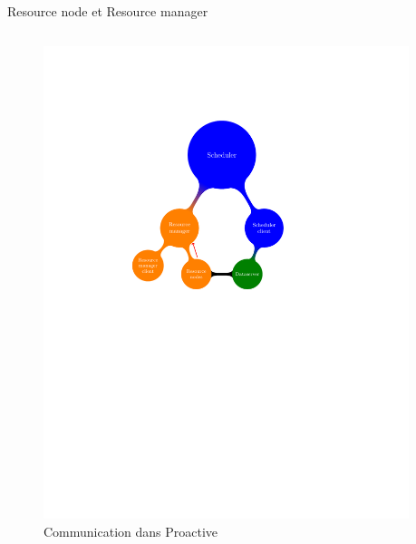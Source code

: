 \documentclass{beamer}
\begin{document}
\begin{frame}{Resource node et Resource manager}
	\begin{columns}
	\begin{column}[l]{0.5\linewidth}
        \begin{figure}
            \centering
            \includegraphics[trim=4cm 13cm 2cm 5cm,scale=0.48]{node_declaration.pdf}
            \caption{Communication dans Proactive}
        \end{figure}
	\end{column}
	\begin{column}[r]{0.5\linewidth}
        

\end{column}
\end{columns}
\end{frame}
\end{document}
